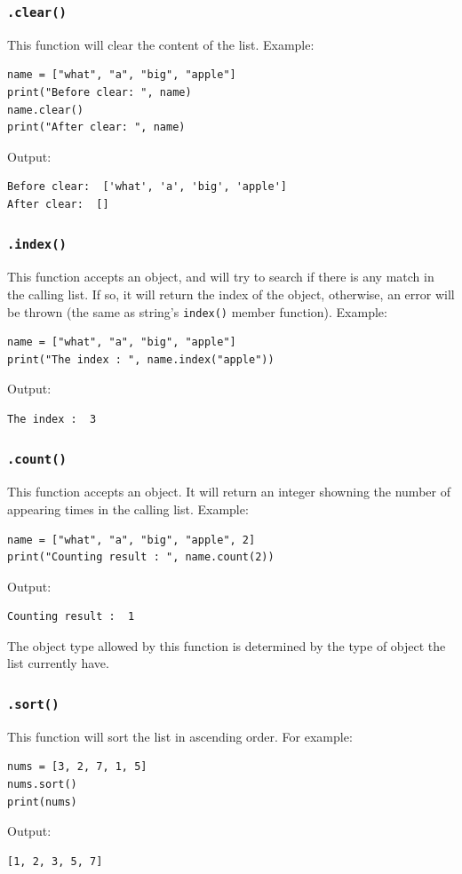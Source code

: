 \documentclass[12pt]{book}
\begin{document}
\subsubsection{\texttt{.clear()}}
\label{sec:orgb9eabed}
This function will clear the content of the list. Example:
\begin{verbatim}
name = ["what", "a", "big", "apple"]
print("Before clear: ", name)
name.clear()
print("After clear: ", name)
\end{verbatim}
Output:
\begin{verbatim}
Before clear:  ['what', 'a', 'big', 'apple']
After clear:  []
\end{verbatim}
\subsubsection{\texttt{.index()}}
\label{sec:org00d89af}
This function accepts an object, and will try to search if there is any match in the calling list. If so, it will return the index of the object, otherwise, an error will be thrown (the same as string's \texttt{index()} member function). Example:
\begin{verbatim}
name = ["what", "a", "big", "apple"]
print("The index : ", name.index("apple"))
\end{verbatim}
Output:
\begin{verbatim}
The index :  3
\end{verbatim}
\subsubsection{\texttt{.count()}}
\label{sec:org81cfe55}
This function accepts an object. It will return an integer showning the number of appearing times in the calling list. Example:
\begin{verbatim}
name = ["what", "a", "big", "apple", 2]
print("Counting result : ", name.count(2))
\end{verbatim}
Output:
\begin{verbatim}
Counting result :  1
\end{verbatim}

The object type allowed by this function is determined by the type of object the list currently have.
\subsubsection{\texttt{.sort()}}
\label{sec:org278a7dc}
This function will sort the list in ascending order. For example:
\begin{verbatim}
nums = [3, 2, 7, 1, 5]
nums.sort()
print(nums)
\end{verbatim}
Output:
\begin{verbatim}
[1, 2, 3, 5, 7]
\end{verbatim}
\end{document}
